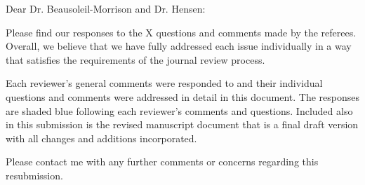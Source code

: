 

\opening{Dear Dr. Beausoleil-Morrison and Dr. Hensen:}


\begin{newlfm}
Please find our responses to the X questions and comments made by the referees. Overall, we believe that we have fully addressed each issue individually in a way that satisfies the requirements of the journal review process. 

Each reviewer's general comments were responded to and their individual questions and comments were addressed in detail in this document. The responses are shaded blue following each reviewer's comments and questions. Included also in this submission is the revised manuscript document that is a final draft version with all changes and additions incorporated.

Please contact me with any further comments or concerns regarding this resubmission.

\end{newlfm}

